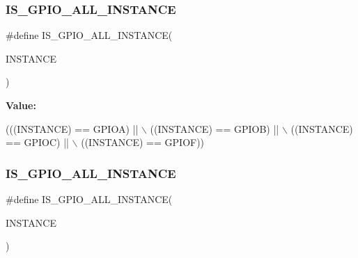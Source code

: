 \subsubsection{\texorpdfstring{I\+S\+\_\+\+G\+P\+I\+O\+\_\+\+A\+L\+L\+\_\+\+I\+N\+S\+T\+A\+N\+CE}{IS\_GPIO\_ALL\_INSTANCE}\hspace{0.1cm}{\footnotesize\ttfamily [12/16]}}
{\footnotesize\ttfamily \#define I\+S\+\_\+\+G\+P\+I\+O\+\_\+\+A\+L\+L\+\_\+\+I\+N\+S\+T\+A\+N\+CE(\begin{DoxyParamCaption}\item[{}]{I\+N\+S\+T\+A\+N\+CE }\end{DoxyParamCaption})}

{\bfseries Value\+:}
\begin{DoxyCode}
(((INSTANCE) == GPIOA) || \(\backslash\)
                                         ((INSTANCE) == GPIOB) || \(\backslash\)
                                         ((INSTANCE) == GPIOC) || \(\backslash\)
                                         ((INSTANCE) == GPIOF))
\end{DoxyCode}
\mbox{\label{group___exported__macro_ga783626dd2431afebea836a102e318957}} 
\subsubsection{\texorpdfstring{I\+S\+\_\+\+G\+P\+I\+O\+\_\+\+A\+L\+L\+\_\+\+I\+N\+S\+T\+A\+N\+CE}{IS\_GPIO\_ALL\_INSTANCE}\hspace{0.1cm}{\footnotesize\ttfamily [13/16]}}
{\footnotesize\ttfamily \#define I\+S\+\_\+\+G\+P\+I\+O\+\_\+\+A\+L\+L\+\_\+\+I\+N\+S\+T\+A\+N\+CE(\begin{DoxyParamCaption}\item[{}]{I\+N\+S\+T\+A\+N\+CE }\end{DoxyParamCaption})}

